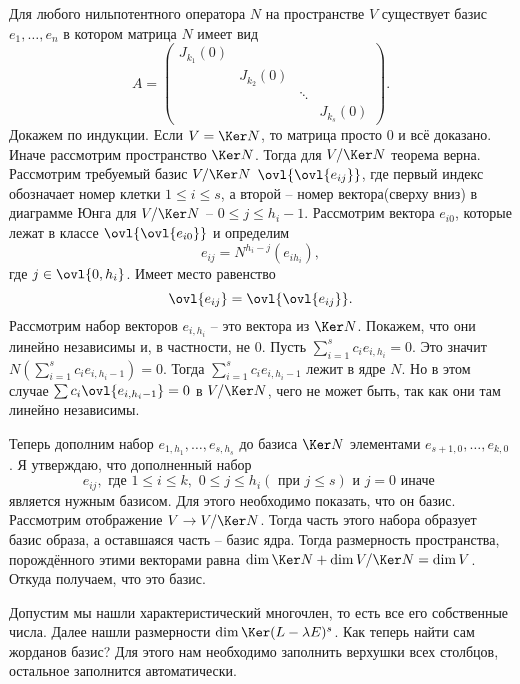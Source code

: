 \lm[Основная] Для любого нильпотентного оператора $N$ на пространстве $V$ существует базис $e_1,\dots,e_n$ в котором матрица $N$ имеет вид
$$A=\begin{pmatrix}
J_{k_1}(0) &&&\\
& J_{k_2}(0) &&\\
&& \ddots& \\
&&& J_{k_s}(0)
\end{pmatrix}.
$$
\elm
\proof
Докажем по индукции. Если $V=\Ker N$, то матрица просто 0 и всё доказано. Иначе рассмотрим пространство $\Ker N$. Тогда для $V/\Ker N$ теорема верна. Рассмотрим требуемый базис $V/\Ker N$ $\ovl{\ovl{e_{ij}}}$, где первый индекс обозначает номер клетки $1\leq i \leq s$, а второй -- номер вектора(сверху вниз) в  диаграмме Юнга для $V/\Ker N$ -- $0\leq j\leq h_i-1$.
Рассмотрим вектора $e_{i0}$, которые лежат в классе $\ovl{\ovl{e_{i0}}}$ и определим $$e_{ij}=N^{h_i-j}(e_{ih_i}),$$ где  $j\in \ovl{0,h_i}$. Имеет место равенство $$\ovl{e_{ij}}=\ovl{\ovl{e_{ij}}}.$$
Рассмотрим набор векторов $e_{i,h_i}$ -- это вектора из $\Ker N$.
Покажем, что они линейно независимы и, в частности, не 0. Пусть $\sum_{i=1}^s c_ie_{i,h_i}=0$. Это значит $N(\sum_{i=1}^s c_i e_{i,h_i-1} )=0$. Тогда $\sum_{i=1}^s c_i e_{i,h_i-1} $ лежит в ядре $N$. Но в этом случае $\sum c_i \ovl{e_{i,h_i-1}}=0$ в $V/\Ker N$, чего не может быть, так как они там линейно независимы.

Теперь дополним набор $e_{1,h_1},\dots,e_{s,h_s}$ до базиса $\Ker N$  элементами $e_{s+1,0},\dots,e_{k,0}$. Я утверждаю, что  дополненный набор 
$$e_{ij}, \text{ где } 1\leq i\leq k, \,\, 0\leq j\leq h_i (\text{ при } j\leq s) \text{ и } j=0 \text{ иначе }$$
является нужным базисом. Для этого необходимо показать, что он базис. Рассмотрим отображение $V \to V/\Ker N$. Тогда часть этого набора образует базис образа, а оставшаяся часть -- базис ядра. Тогда размерность пространства, порождённого этими векторами равна $\dim \Ker N + \dim V/\Ker N = \dim V$. Откуда получаем, что это базис.

\endproof

\endproof








Допустим мы нашли характеристический многочлен, то есть все его собственные числа. Далее нашли размерности $\dim \Ker(L-\lambda E)^s$. Как теперь найти сам жорданов базис? Для этого нам необходимо заполнить верхушки всех столбцов, остальное заполнится автоматически.



